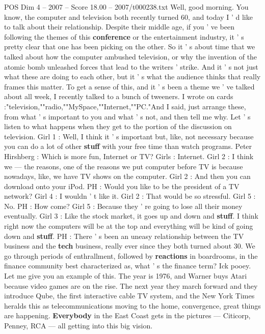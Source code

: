 \begin{textsample}{POS Dim 4 – 2007 – Score 18.00 – 2007/t000238.txt}  \label{ex:f4_pos_018}
Well, good morning.
You know, the computer and television both recently turned 60, and today I ' d like to talk about their relationship.
Despite their middle age, if you ' ve been following the themes of this \textbf{conference} or the entertainment industry, it ' s pretty clear that one has been picking on the other.
So it ' s about time that we talked about how the computer ambushed television, or why the invention of the atomic bomb unleashed forces that lead to the writers ' strike.
And it ' s not just what these are doing to each other, but it ' s what the audience thinks that really frames this matter.
To get a sense of this, and it ' s been a theme we ' ve talked about all week, I recently talked to a bunch of tweeners.
I wrote on cards :"television,""radio,""MySpace,""Internet,""PC."And I said, just arrange these, from what ' s important to you and what ' s not, and then tell me why.
Let ' s listen to what happens when they get to the portion of the discussion on television.
Girl 1 : Well, I think it ' s important but, like, not necessary because you can do a lot of other \textbf{stuff} with your free time than watch programs.
Peter Hirshberg : Which is more fun, Internet or TV?
Girls : Internet.
Girl 2 : I think we — the reasons, one of the reasons we put computer before TV is because nowadays, like, we have TV shows on the computer.
Girl 2 : And then you can download onto your iPod.
PH : Would you like to be the president of a TV network?
Girl 4 : I wouldn ' t like it.
Girl 2 : That would be so stressful.
Girl 5 : No.
PH : How come?
Girl 5 : Because they ' re going to lose all their money eventually.
Girl 3 : Like the stock market, it goes up and down and \textbf{stuff}.
I think right now the computers will be at the top and everything will be kind of going down and \textbf{stuff}.
PH : There ' s been an uneasy relationship between the TV business and the \textbf{tech} business, really ever since they both turned about 30.
We go through periods of enthrallment, followed by \textbf{reactions} in boardrooms, in the finance community best characterized as, what ' s the finance term?
Ick pooey.
Let me give you an example of this.
The year is 1976, and Warner buys Atari because video games are on the rise.
The next year they march forward and they introduce Qube, the first interactive cable TV system, and the New York Times heralds this as telecommunications moving to the home, convergence, great things are happening. \textbf{Everybody} in the East Coast gets in the pictures — Citicorp, Penney, RCA — all getting into this big vision.

\end{textsample}
